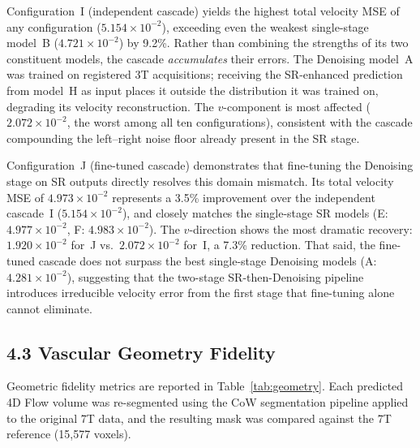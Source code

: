 \documentclass[11pt]{article}
\begin{document}
Configuration~I (independent cascade) yields the highest total velocity MSE of any configuration
($5.154{\times}10^{-2}$), exceeding even the weakest single-stage model~B ($4.721{\times}10^{-2}$)
by 9.2\%.  Rather than combining the strengths of its two constituent models, the cascade
\emph{accumulates} their errors.  The Denoising model~A was trained on registered 3T
acquisitions; receiving the SR-enhanced prediction from model~H as input places it outside the
distribution it was trained on, degrading its velocity reconstruction.  The $v$-component is
most affected ($2.072{\times}10^{-2}$, the worst among all ten configurations), consistent with
the cascade compounding the left--right noise floor already present in the SR stage.

Configuration~J (fine-tuned cascade) demonstrates that fine-tuning the Denoising stage on SR
outputs directly resolves this domain mismatch.  Its total velocity MSE of $4.973{\times}10^{-2}$
represents a 3.5\% improvement over the independent cascade~I ($5.154{\times}10^{-2}$), and
closely matches the single-stage SR models (E: $4.977{\times}10^{-2}$, F: $4.983{\times}10^{-2}$).
The $v$-direction shows the most dramatic recovery: $1.920{\times}10^{-2}$ for~J vs.\
$2.072{\times}10^{-2}$ for~I, a 7.3\% reduction.  That said, the fine-tuned cascade does not
surpass the best single-stage Denoising models (A: $4.281{\times}10^{-2}$), suggesting that the
two-stage SR-then-Denoising pipeline introduces irreducible velocity error from the first
stage that fine-tuning alone cannot eliminate.

\subsection*{4.3 Vascular Geometry Fidelity}

Geometric fidelity metrics are reported in Table~\ref{tab:geometry}.  Each predicted 4D Flow
volume was re-segmented using the CoW segmentation pipeline applied to the original 7T data,
and the resulting mask was compared against the 7T reference (15{,}577 voxels).
\end{document}
